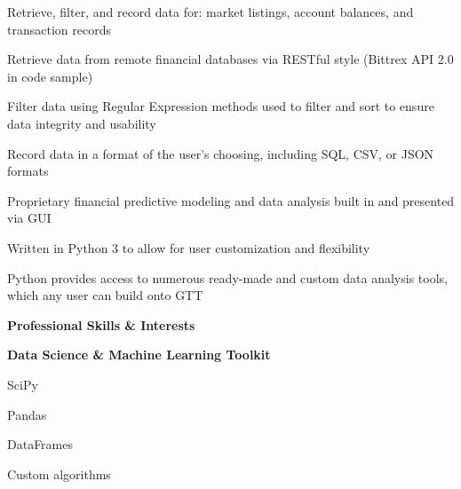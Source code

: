 \documentclass[letterpaper,final]{memoir}
\newcommand{\LargeSep}{\vspace{1.3em}}
\newcommand{\Sep}{\vspace{1.0em}}
\newcommand{\SmallSep}{\vspace{0.4em}}
\newcommand{\CVSection}[1]
	{\LARGE\textbf{#1}\par
	\SmallSep\normalsize}
\newcommand{\CVItem}[1]
	{\textbf{\color{Blue} #1}}
\begin{document}
\begin{compactitem}[\color{Blue}$\circ$]

    \SmallSep
    
    \item Retrieve, filter, and record data for: market listings, account balances, and transaction records
    
    \item Retrieve data from remote financial databases via RESTful style (Bittrex API 2.0 in code sample)
    
    \item Filter data using Regular Expression methods used to filter and sort to ensure data integrity and usability
    
    \item Record data in a format of the user's choosing, including SQL, CSV, or JSON formats
    
    \item Proprietary financial predictive modeling and data analysis built in and presented via GUI
    
    \item Written in Python 3 to allow for user customization and flexibility
    
    \item Python provides access to numerous ready-made and custom data analysis tools, which any user can build onto GTT
   

\end{compactitem}

\LargeSep


\notoserif \CVSection{Professional Skills \& Interests}

\normalfont

\Sep

\CVItem{Data Science \& Machine Learning Toolkit}

\SmallSep

\begin{multicols}{4}

    \begin{compactitem}[\color{Blue}$\circ$]
		
		\item SciPy
        \SmallSep
        
        \item Pandas
        \SmallSep
        
        \item DataFrames
        \SmallSep
        
        \item Custom algorithms
        
    
	\end{compactitem}

\end{multicols}
\end{document}
